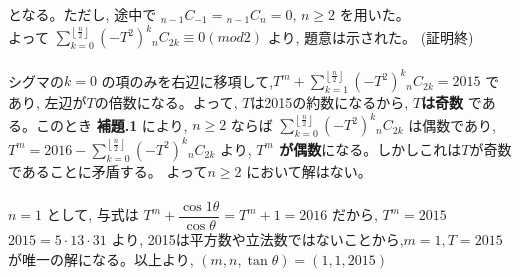 \begin{enumerate}
となる。ただし, 途中で ${}_{n-1}C_{-1}={}_{n-1}C_{n}=0$, $n\ge 2$ を用いた。\\
よって $\displaystyle\sum_{k=0}^{\left\lfloor\frac{n}{2}\right\rfloor} (-T^2)^k{}_nC_{2k}\equiv 0 (mod 2)$ より, 題意は示された。   (証明終)\\
\\
シグマの$k=0$ の項のみを右辺に移項して,$T^m+\displaystyle\sum_{k=1}^{\left\lfloor\frac{n}{2}\right\rfloor} (-T^2)^k{}_nC_{2k} =2015$ であり, 左辺が$T$の倍数になる。よって, $T$は2015の約数になるから, {\bf $T$は奇数} である。このとき {\bf 補題.1} により, $n\ge 2$ ならば $\displaystyle\sum_{k=0}^{\left\lfloor\frac{n}{2}\right\rfloor} (-T^2)^k{}_nC_{2k}$ は偶数であり,$T^m=2016-\displaystyle\sum_{k=0}^{\left\lfloor\frac{n}{2}\right\rfloor} (-T^2)^k{}_nC_{2k}$ より, {\bf $T^m$ が偶数}になる。しかしこれは$T$が奇数であることに矛盾する。 よって$n\ge 2$ において解はない。\\
\\
$n=1$ として, 与式は $T^m+\dfrac{\cos{1\theta}}{\cos{\theta}}=T^m+1=2016$ だから, $T^m=2015$\\
$2015=5\cdot 13\cdot 31$ より, 2015は平方数や立法数ではないことから,$m=1, T=2015$ が唯一の解になる。以上より, $(m,n,\tan{\theta})=(1,1,2015)$
\end{enumerate}
